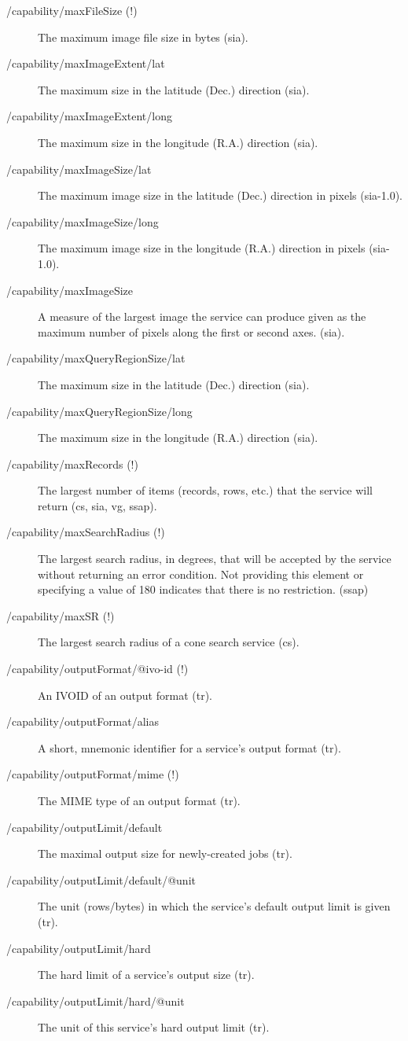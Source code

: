 \documentclass[11pt,a4paper]{ivoa}
\begin{document}
\begin{description}
\item[/capability/maxFileSize (!)]The maximum image file size in bytes (sia).
\item[/capability/maxImageExtent/lat]The maximum size in the latitude (Dec.) direction (sia).
\item[/capability/maxImageExtent/long]The maximum size in the longitude (R.A.) direction (sia).
\item[/capability/maxImageSize/lat]The maximum image size in the latitude (Dec.) direction in pixels (sia-1.0).
\item[/capability/maxImageSize/long]The maximum image size in the longitude (R.A.) direction in pixels (sia-1.0).
\item[/capability/maxImageSize]A measure of the largest image the service can produce given as the maximum number of pixels along the first or second axes. (sia).
\item[/capability/maxQueryRegionSize/lat]The maximum size in the latitude (Dec.) direction (sia).
\item[/capability/maxQueryRegionSize/long]The maximum size in the longitude (R.A.) direction (sia).
\item[/capability/maxRecords (!)]The largest number of items (records, rows, etc.) that the service will return (cs, sia, vg, ssap).
\item[/capability/maxSearchRadius (!)]The largest search radius, in degrees, that will be accepted by the service without returning an error condition. Not providing this element or specifying a value of 180 indicates that there is no restriction. (ssap)
\item[/capability/maxSR (!)]The largest search radius of a cone search service (cs).
\item[/capability/outputFormat/@ivo-id (!)]An IVOID of an output format (tr).
\item[/capability/outputFormat/alias]A short, mnemonic identifier for a service's output format (tr).
\item[/capability/outputFormat/mime (!)]The MIME type of an output format (tr).
\item[/capability/outputLimit/default]The maximal output size for newly-created jobs (tr).
\item[/capability/outputLimit/default/@unit]The unit (rows/bytes) in which the service's default output limit is given (tr).
\item[/capability/outputLimit/hard]The hard limit of a service's output size (tr).
\item[/capability/outputLimit/hard/@unit]The unit of this service's hard output limit (tr).

\end{description}
\end{document}
